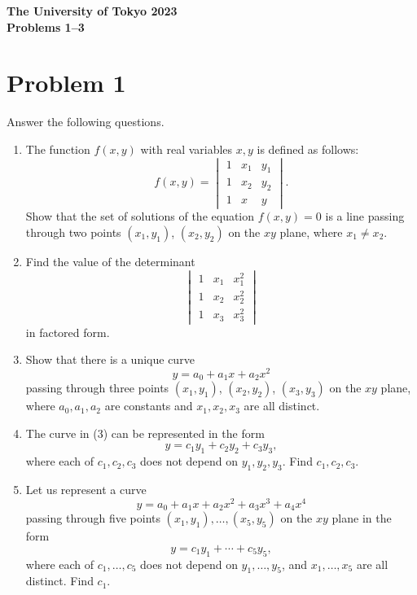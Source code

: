\documentclass[10pt,a4paper]{article}
\begin{document}
\begin{center}
  {\Large \textbf{The University of Tokyo 2023}}\\[2mm]
  {\large \textbf{Problems 1--3}}
\end{center}

\section*{Problem 1}

Answer the following questions.

\begin{enumerate}
  \item The function $f(x,y)$ with real variables $x,y$ is defined as follows:
        \[
          f(x,y)=
          \begin{vmatrix}
            1 & x_1 & y_1\\
            1 & x_2 & y_2\\
            1 & x & y
          \end{vmatrix}.
        \]
        Show that the set of solutions of the equation $f(x,y)=0$ is a line passing through two points $(x_1,y_1)$, $(x_2,y_2)$ on the $xy$ plane, where $x_1\neq x_2$.

  \item Find the value of the determinant
        \[
          \begin{vmatrix}
            1 & x_1 & x_1^2\\
            1 & x_2 & x_2^2\\
            1 & x_3 & x_3^2
          \end{vmatrix}
        \]
        in factored form.

  \item Show that there is a unique curve
        \[
          y=a_0+a_1x+a_2x^2
        \]
        passing through three points $(x_1,y_1)$, $(x_2,y_2)$, $(x_3,y_3)$ on the $xy$ plane, where $a_0,a_1,a_2$ are constants and $x_1,x_2,x_3$ are all distinct.

  \item The curve in (3) can be represented in the form
        \[
          y=c_1y_1+c_2y_2+c_3y_3,
        \]
        where each of $c_1,c_2,c_3$ does not depend on $y_1,y_2,y_3$. Find $c_1,c_2,c_3$.

  \item Let us represent a curve
        \[
          y=a_0+a_1x+a_2x^2+a_3x^3+a_4x^4
        \]
        passing through five points $(x_1,y_1),\ldots,(x_5,y_5)$ on the $xy$ plane in the form
        \[
          y=c_1y_1+\cdots+c_5y_5,
        \]
        where each of $c_1,\ldots,c_5$ does not depend on $y_1,\ldots,y_5$, and $x_1,\ldots,x_5$ are all distinct. Find $c_1$.
\end{enumerate}
\end{document}
